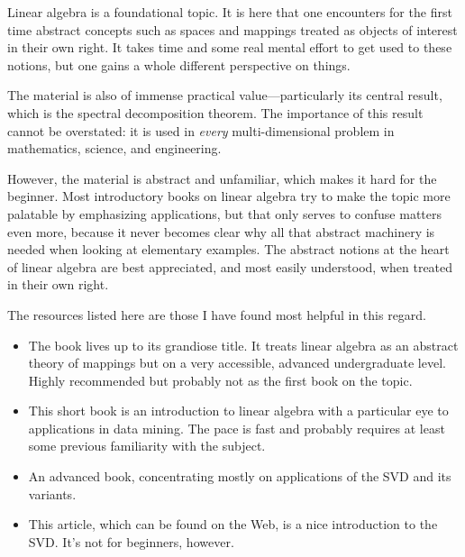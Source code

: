 Linear algebra is a foundational topic. It is here that one encounters
for the first time abstract concepts such as spaces and mappings
treated as objects of interest in their own right. It takes time and
some real mental effort to get used to these notions, but one gains a
whole different perspective on things.

The material is also of immense practical value---particularly its
central result, which is the spectral decomposition theorem.  The
importance of this result cannot be overstated: it is used in
\emph{every} multi-dimensional problem in mathematics, science, and
engineering.

However, the material is abstract and unfamiliar, which makes it hard
for the beginner. Most introductory books on linear algebra try to
make the topic more palatable by emphasizing applications, but that
only serves to confuse matters even more, because it never becomes
clear why all that abstract machinery is needed when looking at
elementary examples. The abstract notions at the heart of linear
algebra are best appreciated, and most easily understood, when treated
in their own right.

The resources listed here are those I have found most helpful in this
regard.

\begin{itemize}

\item {}
  The book lives up to its grandiose title. It treats linear algebra
  as an abstract theory of mappings but on a very accessible, advanced
  undergraduate level. Highly recommended but probably not as the first
  book on the topic.

\item {} 
  This short book is an introduction to linear algebra with a
  particular eye to applications in data mining. The pace is fast and
  probably requires at least some previous familiarity with the
  subject.

\item {}
  An advanced book, concentrating mostly on applications of the SVD
  and its variants.

\item {}
  This article, which can be found on the Web, is a nice introduction
  to the SVD. It's not for beginners, however.
\end{itemize}


\clearpage

\thispagestyle{empty}

\cleardoublepage